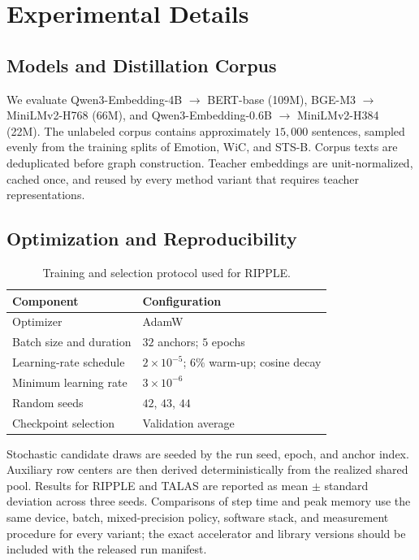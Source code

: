 \section{Experimental Details}
\label{app:experimental-details}

\subsection{Models and Distillation Corpus}

We evaluate Qwen3-Embedding-4B $\rightarrow$ BERT-base (109M), BGE-M3 $\rightarrow$ MiniLMv2-H768 (66M), and Qwen3-Embedding-0.6B $\rightarrow$ MiniLMv2-H384 (22M). The unlabeled corpus contains approximately $15{,}000$ sentences, sampled evenly from the training splits of Emotion, WiC, and STS-B. Corpus texts are deduplicated before graph construction. Teacher embeddings are unit-normalized, cached once, and reused by every method variant that requires teacher representations.

\subsection{Optimization and Reproducibility}

\begin{table}[t]
\centering
\small
\setlength{\tabcolsep}{5pt}
\begin{tabular}{ll}
\toprule
Component & Configuration \\
\midrule
Optimizer & AdamW \\
Batch size and duration & $32$ anchors; $5$ epochs \\
Learning-rate schedule & $2\times10^{-5}$; $6\%$ warm-up; cosine decay \\
Minimum learning rate & $3\times10^{-6}$ \\
Random seeds & $42$, $43$, $44$ \\
Checkpoint selection & Validation average \\
\bottomrule
\end{tabular}
\caption{Training and selection protocol used for RIPPLE.}
\label{tab:optimization-config}
\end{table}

Stochastic candidate draws are seeded by the run seed, epoch, and anchor index. Auxiliary row centers are then derived deterministically from the realized shared pool. Results for RIPPLE and TALAS are reported as mean $\pm$ standard deviation across three seeds. Comparisons of step time and peak memory use the same device, batch, mixed-precision policy, software stack, and measurement procedure for every variant; the exact accelerator and library versions should be included with the released run manifest.

